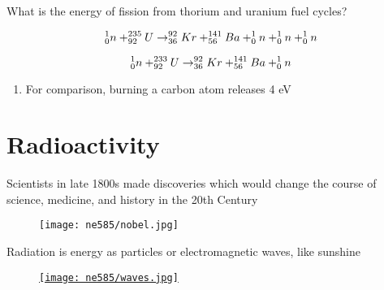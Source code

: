 \documentclass[aspectratio=1610,pdftex,dvipsnames,compress,xcolor={dvipsnames}]{beamer}
\begin{document}
\begin{frame}{What is the energy of fission from thorium and uranium fuel cycles?}

    \begin{equation}
        \LARGE
        ^1_0n + ^{235}_{92}U \rightarrow ^{92}_{36}Kr + ^{141}_{56}Ba + ^1_0n + ^1_0n + ^1_0n  
    \end{equation}

    \begin{equation}
        \LARGE
        ^1_0n + ^{233}_{92}U \rightarrow ^{92}_{36}Kr + ^{141}_{56}Ba + ^1_0n   
    \end{equation}

    \vspace*{\fill}

    \begin{enumerate}[series=outerlist,topsep=0pt,itemsep=21pt,leftmargin=*,label=(\arabic*)]
        \item[]For comparison, burning a carbon atom releases 4 eV
    \end{enumerate}
\end{frame}


\section{Radioactivity}


\addtocounter{framenumber}{-1}
\begin{frame}{Scientists in late 1800s made discoveries which would change the course of science, medicine, and history in the 20th Century}
    \begin{figure}
        \centering
        \texttt{[image: ne585/nobel.jpg]}
    \end{figure}
\end{frame}


\begin{frame}{Radiation is energy as particles or electromagnetic waves, like sunshine}
    \begin{figure}
        \centering
        \href{https://www.researchgate.net/profile/Ngai_Chan/publication/277996216/figure/fig5/AS:336497640263680@1457238697222/The-electromagnetic-spectrum-for-different-frequency-bands-and-the-corresponding.jpg}{\texttt{[image: ne585/waves.jpg]}}
    \end{figure}
\end{frame}
\end{document}
